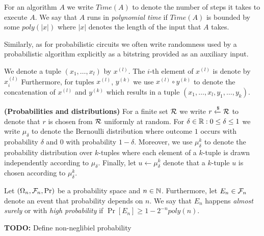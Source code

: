 
For an algorithm $A$ we write $\mathit{Time}(A)$ to denote the number of steps it takes to execute $A$.
We say that $A$ runs in \textit{polynomial time} if $\mathit{Time}(A)$ is bounded by some $poly(|x|)$ where $|x|$ denotes the length of the input that $A$ takes.

Similarly, as for probabilistic circuits we often write randomness used by a probabilistic algorithm explicitly
as a bitstring provided as an auxiliary input.

We denote a tuple $(x_1, \dotsc, x_l)$ by $x^{(l)}$.
The $i$-th element of $x^{(l)}$ is denote by $x^{(l)}_i$
Furthermore, for tuples $x^{(l)}$, $y^{(k)}$ we use $x^{(l)} \circ y^{(k)}$ to denote the concatenation of $x^{(l)}$ and $y^{(k)}$ which results in
a tuple $(x_1, \dotsc, x_l, y_1, \dotsc, y_k)$.

\textbf{(Probabilities and distributions)}
For a finite set $\mathcal{R}$ we write $r \xleftarrow{\$} \mathcal{R}$ to denote that $r$ is chosen from $\mathcal{R}$ uniformly at random.
For $\delta \in \mathbb{R} : 0 \leq \delta \leq 1$ we write $\mu_{\delta}$ to denote the Bernoulli distribution where outcome $1$ occurs with
probability $\delta$ and $0$ with probability $1-\delta$.
Moreover, we use $\mu_{\delta}^k$ to denote the probability distribution over $k$-tuples
where each element of a $k$-tuple is drawn independently according to $\mu_{\delta}$.
Finally, let $u \leftarrow \mu_{\delta}^k$ denote that a $k$-tuple $u$ is chosen according to $\mu_{\delta}^k$.

Let $(\Omega_n, \mathcal{F}_n, \Pr)$ be a probability space and $n \in \mathbb{N}$.
Furthermore, let $E_n \in \mathcal{F}_n$ denote an event that probability depends on $n$.
We say that $E_n$ happens \textit{almost surely} or with \textit{high probability} if $\Pr[E_n] \geq 1 - 2^{-n} \mathit{poly}(n)$.

\begin{todo}
  \textbf{TODO:} Define non-neglibiel probability
\end{todo}

